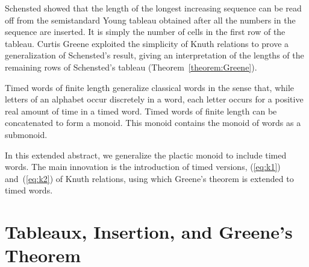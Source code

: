 \documentclass[10pt]{amsproc}
\theoremstyle{definition}
\theoremstyle{remark}
\begin{document}
Schensted showed that the length of the longest increasing sequence can be read off from the semistandard Young tableau obtained after all the numbers in the sequence are inserted.
It is simply the number of cells in the first row of the tableau.
Curtis Greene \cite{Greene-schen} exploited the simplicity of Knuth relations to prove a generalization of Schensted's result, giving an interpretation of the lengths of the remaining rows of Schensted's tableau (Theorem~\ref{theorem:Greene}).

Timed words of finite length generalize classical words in the sense that, while letters of an alphabet occur discretely in a word, each letter occurs for a positive real amount of time in a timed word.
Timed words of finite length can be concatenated to form a monoid.
This monoid contains the monoid of words as a submonoid.

In this extended abstract, we generalize the plactic monoid to include timed words.
The main innovation is the introduction of timed versions, (\ref{eq:k1}) and~(\ref{eq:k2}) of Knuth relations, using which Greene's theorem is extended to timed words.

\section{Tableaux, Insertion, and Greene's Theorem}
\label{sec:tabl-insert-green}
\end{document}
